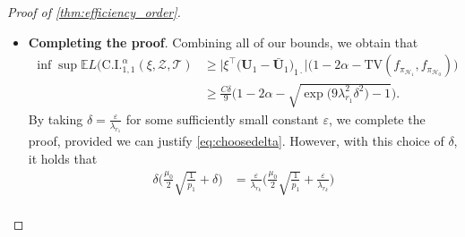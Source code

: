 \documentclass[10pt]{article}
\newcommand{\0}{{\mathbf{0}}}
\newcommand{\1}{{\mathbf{1}}}
\newcommand{\U}{{\mathbf{U}}}
\renewcommand{\t}{^{\top}}
\newcommand{\eps}{\varepsilon}
\begin{document}
\begin{proof}[Proof of \cref{thm:efficiency_order}]
\begin{itemize}
\begin{align*}
    &\geq C\|\xi\|_{\infty} \bigg| \mathbf{v}_{11} - \big(\U_1)_{1r_1} \bigg| \\
    &= C \bigg|\frac{1}{\sqrt{1 + \delta^2 \| (\mathbf{I} - \U_1 \U_1\t ) e_1 \|^2}}\bigg( (\U_1)_{1 r_1} + \delta (\mathbf{I} - \U_1 \U_1\t )_{11} \bigg) - \big(\U_1)_{1r_1} \bigg| \\
    &\geq C\Bigg( \frac{\delta \| |(\mathbf{I} - \U_1 \U_1\t )_{11} \|}{\sqrt{1 + \delta^2 \| (\mathbf{I} - \U_1 \U_1\t ) e_1 \|^2}} - (\U_1)_{11} \bigg( 1 - \frac{1}{\sqrt{1 + \delta^2 \| (\mathbf{I} - \U_1 \U_1\t ) _{11} \|^2}} \bigg) \Bigg) \\
    &\geq C \bigg( \frac{1}{2} \delta \| (\mathbf{I} - \U_1 \U_1\t )_{11} \| - |(\U_1)_{11}| \delta^2 \| (\mathbf{I} - \U_1 \U_1\t )_{11} \|  \bigg) \t \\
    &\geq \frac{C \delta}{4 } \| (\mathbf{I} - \U_1 \U_1\t )_{11} \|.
\end{align*}
The incoherence assumption implies that
\begin{align*}
    \| \U_1 \|_{2,\infty} \leq \frac{\mu_0}{2} \sqrt{\frac{r_1}{p_1}} \leq \frac{1}{2}
\end{align*}
and hence
\begin{align*}
    \| (\mathbf{I} - \U_1 \U_1\t )_{11} \| \geq \frac{1}{2}.
\end{align*}
Therefore,
\begin{align*}
     |\xi\t (\mathbf{\bar U}_1 - \U_1 \big)_{1\cdot}| &\geq \frac{C \delta}{8 }.
     \end{align*}
\item   \textbf{Completing the proof}.     Combining all of our bounds, we obtain that
    \begin{align*}
    \inf \sup    \mathbb{E}  L\big( \mathrm{C.I.}_{1,1}^{\alpha}(\xi,\mathcal{Z},\mathcal{T}) &\geq \big| \xi\t \big( \mathbf{U}_1 - \mathbf{\bar U}_1 \big)_{1\cdot} \big| \big( 1 - 2\alpha - \mathrm{TV}(f_{\pi_{\mathcal{H}_1}}, f_{\pi_{\mathcal{H}_0}} ) \big) \\
        &\geq \frac{C\delta}{9 } \bigg( 1 - 2\alpha - \sqrt{\exp\bigg(9 \lambda_{r_1}^2\delta^2\bigg) - 1} \bigg).
    \end{align*}
    By taking $\delta = \frac{\eps}{\lambda_{r_1}}$ for some sufficiently small constant $\eps$, we complete the proof, provided we can justify \eqref{eq:choosedelta}.  However, with this choice of $\delta$, it holds that
    \begin{align*}
       \delta \bigg( \frac{\mu_0}{2}\sqrt{\frac{1}{p_1}} + \delta \bigg) &= \frac{\eps}{\lambda_{r_k}} \bigg( \frac{\mu_0}{2}\sqrt{\frac{1}{p_1}} +  \frac{\eps}{\lambda_{r_k}}\bigg) \\

\end{align*}
\end{itemize}
\end{proof}
\end{document}
